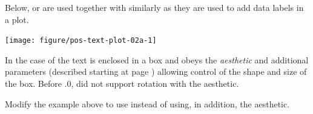 \documentclass[krantz2]{krantz}\usepackage{knitr}
\begin{document}
Below,  or  are used together with  similarly as they are used to add data labels in a plot.

\begin{knitrout}\footnotesize
{}\color{fgcolor}\begin{kframe}
\begin{alltt}
 \hlkwb{<-}
  \hlstd{(} \hlstd{=} \hlopt{:}\hlstd{,}
              \hlstd{=} \hlstd{(}\hlstd{,} \hlstd{),}
              \hlstd{=} \hlstd{(}\hlstd{,} \hlstd{,} \hlstd{,} \hlstd{,} \hlstd{))}
\end{alltt}
\end{kframe}
\end{knitrout}

\begin{knitrout}\footnotesize
{}\color{fgcolor}\begin{kframe}
\begin{alltt}
\hlstd{(} 
        \hlstd{=}    \hlopt{+}
  \hlstd{(} \hlstd{=} \hlstd{,}  \hlstd{=} \hlstd{,}  \hlstd{=} \hlstd{)} \hlopt{+}
  \hlstd{()}
\end{alltt}
\end{kframe}

{\centering \texttt{[image: figure/pos-text-plot-02a-1]} 

}


\end{knitrout}

In the case of  the text is enclosed in a box and obeys the  \emph{aesthetic} and additional parameters (described starting at page \pageref{start:plot:label}) allowing control of the shape and size of the box. Before .0,  did not support rotation with the  aesthetic.

\begin{playground}
Modify the example above to use  instead of  using, in addition, the  aesthetic.
\end{playground}
\end{document}
